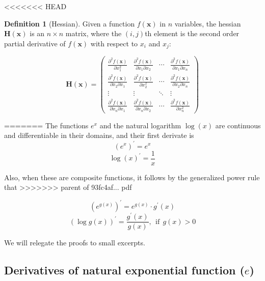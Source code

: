 \documentclass[]{book}
\theoremstyle{definition}
\newtheorem{definition}{Definition}[chapter]
\theoremstyle{definition}
\theoremstyle{definition}
\theoremstyle{remark}
\begin{document}
<<<<<<< HEAD
\begin{definition}[Hessian]
\protect\hypertarget{def:unnamed-chunk-56}{}{\label{def:unnamed-chunk-56} {} }
Given a function \(f(\mathbf{x})\) in \(n\) variables, the hessian \(\mathbf{H(x)}\) is
an \(n\times n\) matrix, where the \((i,j)\)th element is the second order
partial derivative of \(f(\mathbf{x})\) with respect to \(x_i\) and \(x_j\):

\[\mathbf{H(x)}=\begin{pmatrix}
\frac{\partial^2 f(\mathbf{x})}{\partial x_1^2}&\frac{\partial^2f(\mathbf{x})}{\partial x_1 \partial x_2}&
\cdots & \frac{\partial^2 f(\mathbf{x})}{\partial x_1 \partial x_n}\\[9pt]
\frac{\partial^2 f(\mathbf{x})}{\partial x_2 \partial x_1}&\frac{\partial^2f(\mathbf{x})}{\partial x_2^2}&
\cdots & \frac{\partial^2 f(\mathbf{x})}{\partial x_2 \partial x_n}\\
\vdots & \vdots & \ddots & \vdots \\[3pt]
\frac{\partial^2 f(\mathbf{x})}{\partial x_n \partial x_1}&\frac{\partial^2f(\mathbf{x})}{\partial x_n \partial x_2}&
\cdots & \frac{\partial^2 f(\mathbf{x})}{\partial x_n^2}\end{pmatrix}\]
\end{definition}
=======
\protect\hypertarget{thm:derivexplog}{}{\label{thm:derivexplog} }
The functions \(e^x\) and the natural logarithm \(\log(x)\) are continuous and differentiable in their domains, and their first derivate is
\[(e^x)^\prime = e^x\]
\[\log(x)^\prime = \frac{1}{x}\]

Also, when these are composite functions, it follows by the generalized power rule that
>>>>>>> parent of 93fc4af... pdf

\[\left(e^{g(x)}\right)^\prime = e^{g(x)} \cdot g^\prime(x)\]
\[\left(\log g(x)\right)^\prime = \frac{g^\prime(x)}{g(x)}, ~~\text{if}~~ g(x) > 0\]

We will relegate the proofs to small excerpts.

\hypertarget{derivatives-of-natural-exponential-function-e}{%
\subsection*{\texorpdfstring{Derivatives of natural exponential function (\(e\))}{Derivatives of natural exponential function (e)}}\label{derivatives-of-natural-exponential-function-e}}
\end{document}
